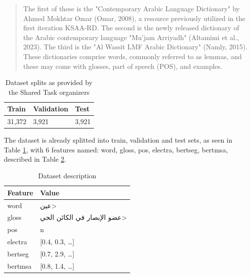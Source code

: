 \documentclass[12.5pt]{article}
\begin{document}
\begin{quote}
    The first of these is the "Contemporary Arabic Language Dictionary" by Ahmed Mokhtar Omar (Omar, 2008), a resource previously utilized in the first iteration KSAA-RD. The second is the newly released dictionary of the Arabic contemporary language "Mu'jam Arriyadh" (Altamimi et al., 2023). The third is the "Al Wassit LMF Arabic Dictionary" (Namly, 2015). These dictionaries comprise words, commonly referred to as lemmas, and these may come with glosses, part of speech (POS), and examples.
\end{quote}

\begin{table}[H]
    \centering
    \caption{Dataset splits as provided by the Shared Task organizers}
    \label{table:dataset-splits}
    \renewcommand{\arraystretch}{1.5}%
    \begin{tabularx}{\textwidth}{|X|X|X|}
        \hline
        \textbf{Train} & \textbf{Validation} & \textbf{Test} \\
        \hline
        31,372 & 3,921 & 3,921 \\
        \hline
    \end{tabularx}
\end{table}

The dataset is already splitted into train, validation and test sets, as seen in Table \ref{table:dataset-splits}, with 6 features named: word, gloss, pos, electra, bertseg, bertmsa, described in Table \ref{table:dataset-desc}.

\begin{table}[H]
    \centering
    \caption{Dataset description}
    \label{table:dataset-desc}
    \renewcommand{\arraystretch}{1.5}%
    \begin{tabularx}{\textwidth}{|l|X|}
        \hline
        \textbf{Feature} & \textbf{Value} \\
        \hline
        word & \<عين> \\
        \hline
        gloss & \<عضو الإبصار في الكائن الحي> \\
        \hline
        pos & n \\
        \hline
        electra & [0.4, 0.3, …] \\
        \hline
        bertseg & [0.7, 2.9, …] \\
        \hline
        bertmsa & [0.8, 1.4, …] \\
        \hline
    \end{tabularx}
\end{table}
\end{document}
